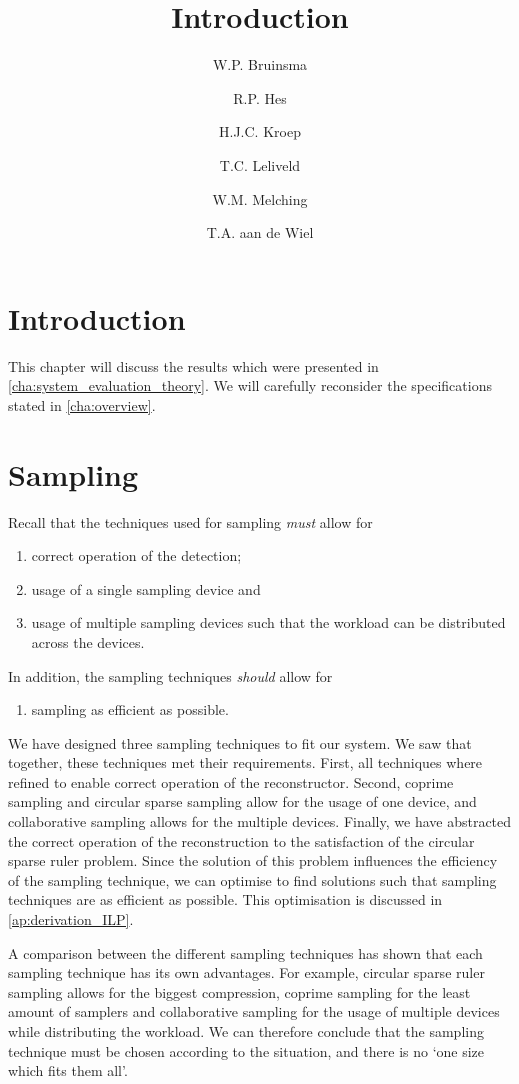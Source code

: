 \documentclass[a4paper, openany, oneside]{memoir}
\title{Introduction}
\author{W.P. Bruinsma \and R.P. Hes \and H.J.C. Kroep \and T.C. Leliveld \and W.M. Melching \and T.A. aan de Wiel}
\begin{document}
\section{Introduction}
This chapter will discuss the results which were presented in \cref{cha:system_evaluation_theory}. We will carefully reconsider the specifications stated in \cref{cha:overview}.

\section{Sampling}
Recall that the techniques used for sampling \emph{must} allow for
\begin{enumerate}
    \item correct operation of the detection;
    \item usage of a single sampling device and
    \item usage of multiple sampling devices such that the workload can be distributed across the devices.
\end{enumerate}
In addition, the sampling techniques \emph{should} allow for
\begin{enumerate}
    \item sampling as efficient as possible.
\end{enumerate}

We have designed three sampling techniques to fit our system. We saw that together, these techniques met their requirements. First, all techniques where refined to enable correct operation of the reconstructor. Second, coprime sampling and circular sparse sampling allow for the usage of one device, and collaborative sampling allows for the multiple devices. Finally, we have abstracted the correct operation of the reconstruction to the satisfaction of the circular sparse ruler problem. Since the solution of this problem influences the efficiency of the sampling technique, we can optimise to find solutions such that sampling techniques are as efficient as possible. This optimisation is discussed in \cref{ap:derivation_ILP}.

A comparison between the different sampling techniques has shown that each sampling technique has its own advantages. For example, circular sparse ruler sampling allows for the biggest compression, coprime sampling for the least amount of samplers and collaborative sampling for the usage of multiple devices while distributing the workload. We can therefore conclude that the sampling technique must be chosen according to the situation, and there is no `one size which fits them all'. 
\end{document}
